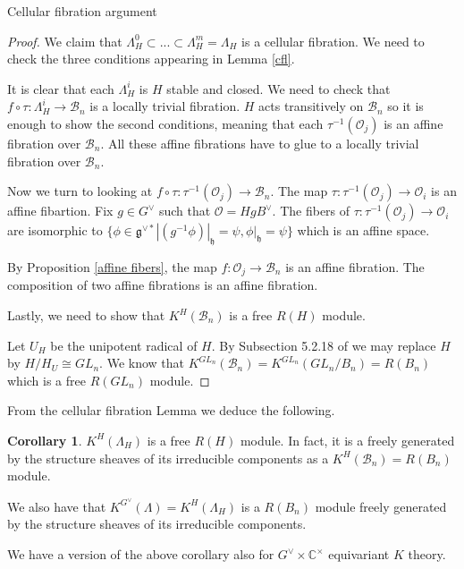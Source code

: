 \documentclass[12pt]{article}
\newcommand{\B}{\mathcal{B}}
\newcommand{\C}{\mathbb{C}}
\newcommand{\s}{\mathcal{O}}
\newcommand{\<}{\langle}
\renewcommand{\>}{\rangle}
\theoremstyle{plain}
\theoremstyle{definition}
\newtheorem{cor}[theorem]{Corollary}
\begin{document}
\begin{section}{Cellular fibration argument}
\begin{proof}

    We claim that $\Lambda_H^0\subset ...\subset \Lambda^m_H=\Lambda_H$ is a cellular fibration. We need to check the three conditions appearing in Lemma \ref{cfl}.

    It is clear that each $\Lambda^i_H$ is $H$ stable and closed. We need to check that $f\circ \tau:\Lambda^i_H\rightarrow \B_n$ is a locally trivial fibration. $H$ acts transitively on $\B_n$ so it is enough to show the second conditions, meaning that each $\tau^{-1}(\s_j)$ is an affine fibration over $\B_n$. All these affine fibrations have to glue to a locally trivial fibration over $\B_n$.

    Now we turn to looking at $f\circ\tau :\tau^{-1}(\s_j)\rightarrow \B_n$. The map $\tau:\tau^{-1}(\s_j)\rightarrow \s_i$ is an affine fibartion. Fix $g\in G^\vee$ such that $\s=HgB^\vee$. The fibers of $\tau:\tau^{-1}(\s_j)\rightarrow \s_i$ are isomorphic to $\{\phi\in \mathfrak{g}^{\vee *}|(g^{-1}\phi)|_\mathfrak{h}=\psi,\phi|_\mathfrak{h}=\psi\}$ which is an affine space.

    By Proposition \ref{affine fibers}, the map $f:\s_j\rightarrow\B_n$ is an affine fibration. The composition of two affine fibrations is an affine fibration.
    
    Lastly, we need to show that $K^H(\B_n)$ is a free $R(H)$ module. 

    Let $U_H$ be the unipotent radical of $H$. By Subsection 5.2.18 of \cite{Chriss1997RepresentationTA} we may replace $H$ by $H/H_U\cong GL_n$. We know that $K^{GL_n}(\B_n)=K^{GL_n}(GL_n/B_n)=R(B_n)$ which is a free $R(GL_n)$ module.
    
\end{proof}



From the cellular fibration Lemma we deduce the following.

\begin{cor}
    $K^H(\Lambda_H)$ is a free $R(H)$ module. In fact, it is a freely   generated by the structure sheaves of its irreducible components as a $K^H(\B_n)=R(B_n)$ module.

    We also have that $K^{G^\vee}(\Lambda)=K^H(\Lambda_H)$ is a $R(B_n)$ module freely generated by the structure sheaves of its irreducible components.
\end{cor}

We have a version of the above corollary also for $G^\vee\times \C^\times$ equivariant $K$ theory.


\end{section}
\end{document}
